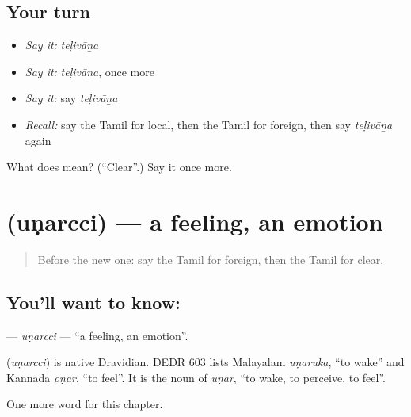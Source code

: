 \subsection*{Your turn}
\begin{itemize}
\raggedright
  \item \emph{Say it:} \emph{teḷivāṉa}
  \item \emph{Say it:} \emph{teḷivāṉa}, once more
  \item \emph{Say it:} say \emph{teḷivāṉa}
  \item \emph{Recall:} say the Tamil for local, then the Tamil for foreign, then say \emph{teḷivāṉa} again
\end{itemize}

\begin{tcolorbox}[breakable,colback=teal!4,colframe=teal!35!black,title={Before you move on}]
What does  mean? (\textquotedblleft{}Clear\textquotedblright{}.) Say it once more.
\end{tcolorbox}
\section[\texorpdfstring{\ta{உணர்ச்சி} (uṇarcci)}{உணர்ச்சி (uṇarcci)}]{ (uṇarcci) — a feeling, an emotion}

\label{lesson:TA-C179-unarcci}



\begin{quote}
Before the new one: say the Tamil for foreign, then the Tamil for clear.
\end{quote}

\subsection*{You'll want to know: }
\textbf{} — \emph{uṇarcci} — \textquotedblleft{}a feeling, an emotion\textquotedblright{}.

\begin{cousinweb}
\textbf{} (\emph{uṇarcci}) is native Dravidian. DEDR 603 lists Malayalam \emph{uṇaruka}, \textquotedblleft{}to wake\textquotedblright{} and Kannada \emph{oṇar}, \textquotedblleft{}to feel\textquotedblright{}. It is the noun of \emph{uṇar}, \textquotedblleft{}to wake, to perceive, to feel\textquotedblright{}.
\end{cousinweb}

\begin{grammarlens}[title={What you've built}]
One more word for this chapter.
\end{grammarlens}

